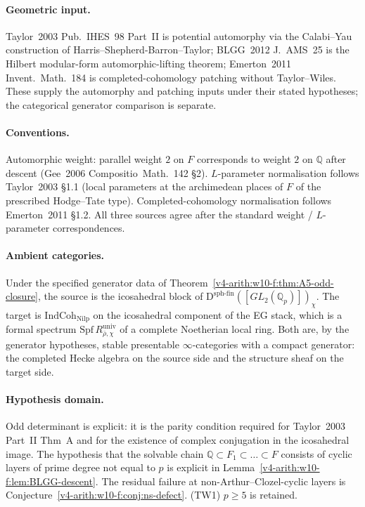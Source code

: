 \paragraph{Geometric input.} Taylor~2003 Pub.~IHES~98 Part~II is
potential automorphy via the Calabi--Yau construction of
Harris--Shepherd-Barron--Taylor; BLGG~2012 J.~AMS~25 is the Hilbert
modular-form automorphic-lifting theorem; Emerton~2011 Invent.~Math.~184
is completed-cohomology patching without Taylor--Wiles. These supply the automorphy and patching inputs under their stated
hypotheses; the categorical generator comparison is separate.

\paragraph{Conventions.} Automorphic weight:
parallel weight \(2\) on \(F\) corresponds to weight \(2\) on
\(\mathbb{Q}\) after descent (Gee~2006 Compositio~Math.~142 \S 2).
\(L\)-parameter normalisation follows Taylor~2003 \S 1.1 (local
parameters at the archimedean places of \(F\) of the prescribed
Hodge--Tate type). Completed-cohomology normalisation follows
Emerton~2011 \S 1.2. All three sources agree after the standard
weight / \(L\)-parameter correspondences.

\paragraph{Ambient categories.} Under the specified generator data of
Theorem~\ref{v4-arith:w10-f:thm:A5-odd-closure}, the source is the icosahedral
block of
\(\mathrm{D}^{\mathrm{sph\text{-}fin}}([GL_{2}(\mathbb{Q}_{p})])_{\chi}\).
The target is \(\mathrm{IndCoh}_{\mathrm{Nilp}}\) on the icosahedral
component of the EG stack, which is a formal spectrum
\(\mathrm{Spf}\,R^{\mathrm{univ}}_{\bar\rho,\chi}\) of a complete
Noetherian local ring. Both are, by the generator hypotheses, stable presentable
\(\infty\)-categories with a compact generator: the completed Hecke
algebra on the source side and the structure sheaf on the target side.

\paragraph{Hypothesis domain.} Odd determinant is explicit: it is the
parity condition required for Taylor~2003 Part~II Thm~A and for the
existence of complex conjugation in the icosahedral image. The
hypothesis that the solvable chain
\(\mathbb{Q}\subset F_{1}\subset\ldots\subset F\) consists of cyclic
layers of prime degree not equal to \(p\) is explicit in
Lemma~\ref{v4-arith:w10-f:lem:BLGG-descent}. The residual failure at
non-Arthur--Clozel-cyclic layers is
Conjecture~\ref{v4-arith:w10-f:conj:ns-defect}. (TW1) \(p\geq 5\) is retained.

